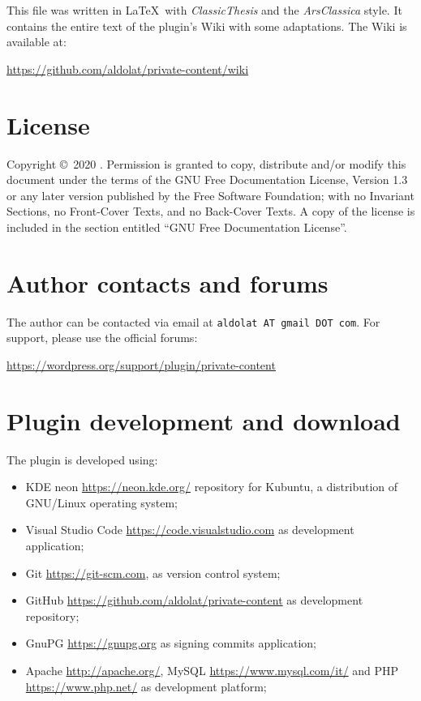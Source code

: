 \begingroup
	\footnotesize

	\noindent This file was written in \LaTeX~with \emph{ClassicThesis} and the
	\emph{ArsClassica} style. It contains the entire text of the plugin's Wiki
	with some adaptations. The Wiki is available at:

	\begin{center}
		\url{https://github.com/aldolat/private-content/wiki}
	\end{center}

	\vfill

	\section*{License}

	Copyright \copyright~2020 \myName.\newline
    \noindent Permission is granted to copy, distribute and/or modify this
    document under the terms of the GNU Free Documentation License, Version 1.3
    or any later version published by the Free Software Foundation; with no
    Invariant Sections, no Front-Cover Texts, and no Back-Cover Texts. A copy of
    the license is included in the section entitled ``GNU Free Documentation
	License''.

	\section*{Author contacts and forums}

	\noindent The author can be contacted via email at \texttt{aldolat AT gmail
	DOT com}.
	For support, please use the official forums:
	\begin{center}
	\url{https://wordpress.org/support/plugin/private-content}
	\end{center}
\endgroup

\newpage

\begingroup

	\footnotesize

	\section*{Plugin development and download}

	\noindent The plugin is developed using:

	\begin{itemize}
		\item KDE neon \url{https://neon.kde.org/} repository for Kubuntu, a
		distribution of GNU/Linux operating system;
		\item Visual Studio Code \url{https://code.visualstudio.com} as
		development application;
		\item Git \url{https://git-scm.com}, as version control system;
		\item GitHub \url{https://github.com/aldolat/private-content} as
		development repository;
		\item GnuPG \url{https://gnupg.org} as signing commits application;
		\item Apache \url{http://apache.org/}, MySQL
		\url{https://www.mysql.com/it/} and PHP \url{https://www.php.net/} as
		development platform;
	\end{itemize}


